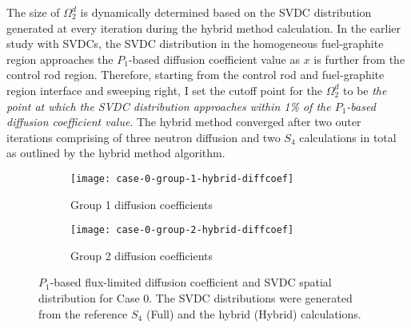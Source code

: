 The size of $\Omega^d_2$
is dynamically determined based on the \gls{SVDC} distribution generated at every iteration during
the hybrid method calculation. In the earlier study with \glspl{SVDC}, the \gls{SVDC} distribution
in the homogeneous fuel-graphite region approaches the $P_1$-based diffusion coefficient value as
$x$ is further from the control rod region. Therefore, starting from the control rod and
fuel-graphite region interface and sweeping right, I set the cutoff point for the $\Omega^d_2$ to
be \textit{the point at which the \gls{SVDC} distribution approaches within 1\% of the $P_1$-based
diffusion coefficient value}. The hybrid method converged after two outer iterations comprising of
three neutron diffusion and two $S_4$ calculations in total as outlined by the hybrid method
algorithm.
%
\begin{figure}[htb!]
  \centering
  \begin{subfigure}[b]{.49\textwidth}
    \centering
    \texttt{[image: case-0-group-1-hybrid-diffcoef]}
    \caption{Group 1 diffusion coefficients}
    \label{fig:c0g1hd}
  \end{subfigure}
  \hfill
  \begin{subfigure}[b]{.49\textwidth}
    \centering
    \texttt{[image: case-0-group-2-hybrid-diffcoef]}
    \caption{Group 2 diffusion coefficients}
    \label{fig:c0g2hd}
  \end{subfigure}
  \caption{$P_1$-based flux-limited diffusion coefficient and \gls{SVDC} spatial distribution for
  Case 0. The \gls{SVDC} distributions were generated from the reference $S_4$ (Full) and the
  hybrid (Hybrid) calculations.}
  \label{fig:c0hd}
\end{figure}


